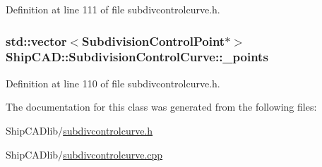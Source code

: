 Definition at line 111 of file subdivcontrolcurve.\-h.

\hypertarget{classShipCAD_1_1SubdivisionControlCurve_ac54ea0783b3f8f2aa65d49fe489f1b4f}{
\subsubsection[{\-\_\-points}]{\setlength{\rightskip}{0pt plus 5cm}std\-::vector$<${\bf Subdivision\-Control\-Point}$\ast$$>$ Ship\-C\-A\-D\-::\-Subdivision\-Control\-Curve\-::\-\_\-points\hspace{0.3cm}{\ttfamily [protected]}}}\label{classShipCAD_1_1SubdivisionControlCurve_ac54ea0783b3f8f2aa65d49fe489f1b4f}


Definition at line 110 of file subdivcontrolcurve.\-h.



The documentation for this class was generated from the following files\-:\begin{DoxyCompactItemize}
\item 
Ship\-C\-A\-Dlib/\hyperlink{subdivcontrolcurve_8h}{subdivcontrolcurve.\-h}\item 
Ship\-C\-A\-Dlib/\hyperlink{subdivcontrolcurve_8cpp}{subdivcontrolcurve.\-cpp}\end{DoxyCompactItemize}
